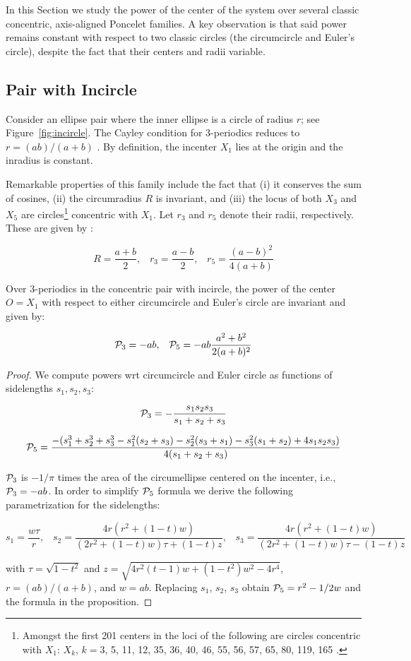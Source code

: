 In this Section we study the power of the center of the system over several classic concentric, axis-aligned Poncelet families. A key observation is that said power remains constant with respect to two classic circles (the circumcircle and Euler's circle), despite the fact that their centers and radii variable.

\subsection{Pair with Incircle}

Consider an ellipse pair where the inner ellipse is a circle of radius $r$; see Figure~\ref{fig:incircle}. The Cayley condition for 3-periodics reduces to $r=(a b)/(a+b)$ \cite[Coroll. 1]{garcia2020-family-ties}. By definition, the incenter $X_1$ lies at the origin and the inradius is constant.

Remarkable properties of this family include the fact that (i) it conserves the sum of cosines, (ii) the circumradius $R$ is invariant, and (iii) the locus of both $X_3$ and $X_5$ are circles\footnote{Amongst the first 201 centers in \cite{etc} the loci of the following are circles concentric with $X_1$: $X_k$, $k=$3, 5, 11, 12, 35, 36, 40, 46, 55, 56, 57, 65, 80, 119, 165 \cite{garcia2020-family-ties}.} concentric with $X_1$. Let $r_3$ and $r_5$ denote their radii, respectively. These are given by \cite[Section 3]{garcia2020-family-ties}:

\[ R = \frac{a+b}{2},\;\;\;r_3 = \frac{a-b}{2},\;\;\;r_5 = \frac{(a-b)^2}{4(a+b)}\]

\begin{proposition}
Over 3-periodics in the concentric pair with incircle, the power of the center $O=X_1$ with respect to either circumcircle \cite[Prop. 1]{garcia2020-family-ties} and Euler's circle are invariant and given by:

\[ \P_3= -a b,\;\;\;\P_5= -a b \frac{a^2 + b^2}{2(a + b)^2}\]

\end{proposition}

\begin{proof}
We compute powers wrt circumcircle and Euler circle as functions of sidelengths $s_1,s_2,s_3$:

\[ \P_3 = -\frac{s_1 s_2 s_3}{s_1 + s_2 + s_3} \]

\[\P_5 = \frac{-(s_1^3 + s_2^3 + s_3^3 - s_1^2(s_2 + s_3) - s_2^2(s_3 + s_1) - s_3^2(s_1 + s_2) + 4 s_1 s_2 s_3 )}{4 (s_1 + s_2 + s_3)} \]

$\P_3$ is $-1/{\pi}$ times the area of the circumellipse centered on the incenter, i.e., $\P_3 = -a b$. In order to simplify $\P_5$ formula we derive the following parametrization for the sidelengths:

\[ s_1 = \frac{w \tau}{r},\;\;\;
 s_2 = \frac{4r(r^2 + (1 - t)w)}{(2r^2 + (1 - t)w)\tau + (1 - t)z},\;\;\;
 s_3 = \frac{4r(r^2 + (1 - t)w)}{(2r^2 + (1 - t)w)\tau - (1 - t)z}\]

\noindent with $\tau=\sqrt{1-t^2}$ and $z =\sqrt{4r^2(t - 1)w + (1 - t^2)w^2 - 4r^4}$, $r =(ab)/(a + b)$, and $w = ab$. Replacing $s_1$, $s_2$, $s_3$ obtain $\P_5 = r^2 - 1/2 w$ and the formula in the proposition.
\end{proof}

